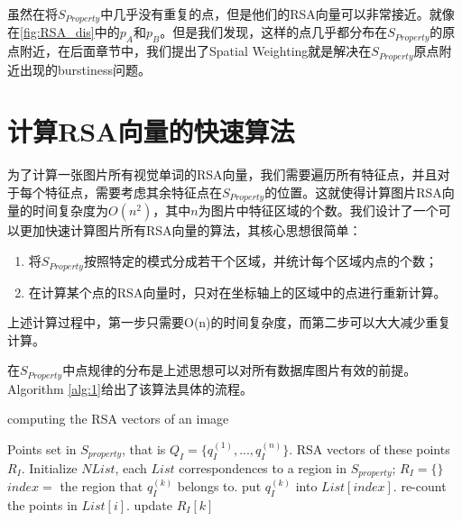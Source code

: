 虽然在将$S_{Property}$中几乎没有重复的点，但是他们的RSA向量可以非常接近。就像在\ref{fig:RSA_dis}中的$p_A$和$p_B$。但是我们发现，这样的点几乎都分布在$S_{Property}$的原点附近，在后面章节中，我们提出了Spatial Weighting就是解决在$S_{Property}$原点附近出现的burstiness\cite{jegou2009burstiness}问题。

\section{计算RSA向量的快速算法}
为了计算一张图片所有视觉单词的RSA向量，我们需要遍历所有特征点，并且对于每个特征点，需要考虑其余特征点在$S_{Property}$的位置。这就使得计算图片RSA向量的时间复杂度为$O(n^2)$，其中$n$为图片中特征区域的个数。我们设计了一个可以更加快速计算图片所有RSA向量的算法，其核心思想很简单：
\begin{enumerate}
	\item 将$S_{Property}$按照特定的模式分成若干个区域，并统计每个区域内点的个数；
	\item 在计算某个点的RSA向量时，只对在坐标轴上的区域中的点进行重新计算。
\end{enumerate}
上述计算过程中，第一步只需要O(n)的时间复杂度，而第二步可以大大减少重复计算。

在$S_{Property}$中点规律的分布是上述思想可以对所有数据库图片有效的前提。Algorithm \ref{alg:1}给出了该算法具体的流程。
\renewcommand{\algorithmicrequire}{\textbf{Input:}} 
\renewcommand{\algorithmicensure}{\textbf{Output:}}
\begin{algorithm}
	\caption{computing the RSA vectors of an image}
	\label{alg:1} 
	\begin{algorithmic}[1]
		\REQUIRE Points set in $S_{property}$, that is $Q_I=\{q_I^{(1)},...,q_I^{(n)}\}$.
		\ENSURE RSA vectors of these points $R_I$.
		\STATE Initialize $N List$, each $List$ correspondences to a region in $S_{property}$;
		\STATE $R_I = \{\}$
		\STATE $index=$ the region that $q_I^{(k)}$ belongs to.
		\STATE put $q_I^{(k)}$ into $List[index]$.
		\ENDFOR
		\STATE re-count the points in $List[i]$.
		\ENDIF
		\ENDFOR
		\STATE update $R_I[k]$
		\ENDFOR
	\end{algorithmic} 
\end{algorithm}

